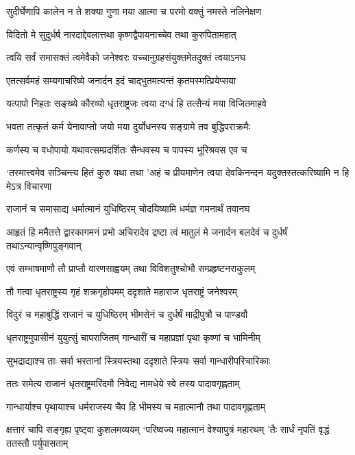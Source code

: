 \twolineshloka
{सुदीर्घेणापि कालेन न ते शक्या गुणा मया}
{आत्मा च परमो वक्तुं नमस्ते नलिनेक्षण}


\twolineshloka
{विदितो मे सुदुर्धर्ष नारदाद्देवलात्तथा}
{कृष्णद्वैपायनाच्चेव तथा कुरुपितामहात्}


\twolineshloka
{त्वयि सर्वं समासक्तं त्वमेवैको जनेश्वरः}
{यच्चानुग्रहसंयुक्तमेतदुक्तं त्वयाऽनघ}


\twolineshloka
{एतत्सर्वमहं सम्यगाचरिष्ये जनार्दन}
{इदं चाद्भुतमत्यन्तं कृतमस्मत्प्रियेप्सया}


\twolineshloka
{यत्पापो निहतः सङ्ख्ये कौरव्यो धृतराष्ट्रजः}
{त्वया दग्धं हि तत्सैन्यं मया विजितमाहवे}


\twolineshloka
{भवता तत्कृतं कर्म येनावाप्तो जयो मया}
{दुर्योधनस्य सङ्ग्रामे तव बुद्धिपराक्रमैः}


\twolineshloka
{कर्णस्य च वधोपायो यथावत्सम्प्रदर्शितः}
{सैन्धवस्य च पापस्य भूरिश्रवस एव च}


\threelineshloka
{`तस्मात्त्वमेव सञ्चिन्त्य हितं कुरु यथा तथा}
{'अहं च प्रीयमाणेन त्वया देवकिनन्दन}
{यदुक्तस्तत्करिष्यामि न हि मेऽत्र विचारणा}


\twolineshloka
{राजानं च समासाद्य धर्मात्मानं युधिष्ठिरम्}
{चोदयिष्यामि धर्मज्ञ गमनार्थं तवानघ}


\threelineshloka
{आहृतं हि ममैतत्ते द्वारकागमनं प्रभो}
{अचिरादेव द्रष्टा त्वं मातुलं मे जनार्दन}
{बलदेवं च दुर्धर्षं तथाऽन्यान्वृष्णिपुङ्गवान्}


\twolineshloka
{एवं सम्भाषमाणौ तौ प्राप्तौ वारणसाह्वयम्}
{तथा विविशतुश्चोभौ सम्प्रहृष्टनराकुलम्}


\twolineshloka
{तौ गत्वा धृतराष्ट्रस्य गृहं शक्रगृहोपमम्}
{ददृशाते महाराज धृतराष्ट्रं जनेश्वरम्}


\twolineshloka
{विदुरं च महाबुद्धिं राजानं च युधिष्ठिरम्}
{भीमसेनं च दुर्धर्षं माद्रीपुत्रौ च पाण्डवौ}


\twolineshloka
{धृतराष्ट्रमुपासीनं युयुत्सुं चापराजितम्}
{गान्धारीं च महाप्रज्ञां पृथा कृष्णां च भामिनीम्}


\twolineshloka
{सुभद्राद्याश्च ताः सर्वा भरतानां स्त्रियस्तथा}
{ददृशाते स्त्रियः सर्वा गान्धारीपरिचारिकाः}


\twolineshloka
{ततः समेत्य राजानं धृतराष्ट्रमरिंदमौ}
{निवेद्य नामधेये स्वे तस्य पादावगृह्णताम्}


\twolineshloka
{गान्धार्याश्च पृथायाश्च धर्मराजस्य चैव हि}
{भीमस्य च महात्मानौ तथा पादावगृह्णताम्}


\threelineshloka
{क्षत्तारं चापि सङ्गृह्य पृष्ट्वा कुशलमव्ययम्}
{`परिष्वज्य महात्मानं वेश्यापुत्रं महारथम्}
{'तैः सार्धं नृपतिं वृद्धं ततस्तौ पर्युपासताम्}


